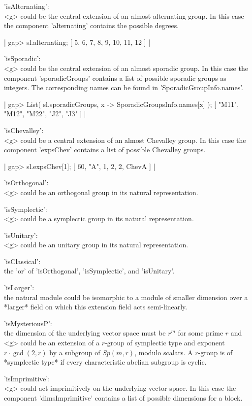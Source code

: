 'isAlternating':\\
  <g> could be the central extension of  an almost alternating group.  In
  this case the component 'alternating' contains the possible degrees.

|    gap> sl.alternating;
    [ 5, 6, 7, 8, 9, 10, 11, 12 ] |

'isSporadic':\\
  <g> could be  the central  extension of  an almost sporadic  group.  In
  this  case the component 'sporadicGroups'  contains  a list of possible
  sporadic groups as integers.  The corresponding names  can  be found in
  'SporadicGroupInfo.names'.

|    gap> List( sl.sporadicGroups, x -> SporadicGroupsInfo.names[x] );
    [ "M11", "M12", "M22", "J2", "J3" ] |

'isChevalley':\\
  <g> could be a central extension of  an almost Chevalley group. In this
  case  the component  'expsChev' contains  a list  of possible Chevalley
  groups.

|    gap> sl.expsChev[1];
    [ 60, "A", 1, 2, 2, ChevA ] |

'isOrthogonal':\\
  <g> could be an orthogonal group in its natural representation.

'isSymplectic':\\
  <g> could be a symplectic group in its natural representation.

'isUnitary':\\
  <g> could be an unitary group in its natural representation.

'isClassical':\\
  the 'or' of 'isOrthogonal', 'isSymplectic', and 'isUnitary'.

'isLarger':\\
  the natural module could be isomorphic to a module of smaller dimension
  over a *larger* field on which this extension field acts semi-linearly.

'isMysteriousP':\\
  the dimension of  the underlying vector space  must  be $r^m$  for some
  prime $r$  and <g> could  be an extension  of a $r$-group of symplectic
  type and exponent $r\cdot\gcd(2,r)$ by  a subgroup of $Sp(m,r)$, modulo
  scalars.  A  $r$-group is of *symplectic  type* if every characteristic
  abelian subgroup is cyclic.

'isImprimitive':\\
  <g> could act imprimitively on   the underlying vector space.  In  this
  case the    component 'dimsImprimitive' contains   a  list  of possible
  dimensions for a block.


